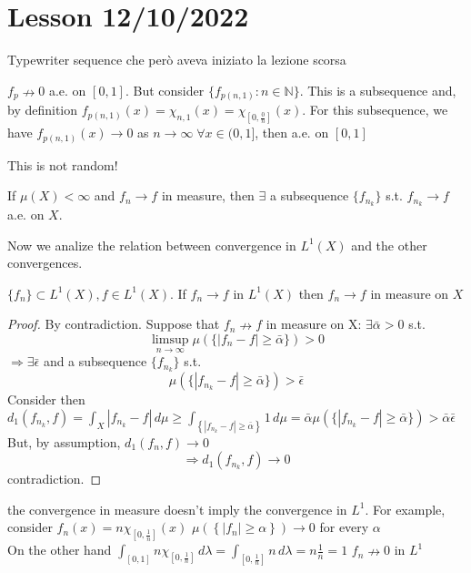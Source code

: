 \section{Lesson 12/10/2022}
Typewriter sequence che però aveva iniziato la lezione scorsa

\begin{remark}
    \( f_p \nrightarrow 0 \) a.e. on \(\left[ 0, 1\right]\).  
    But consider \( \{ f_{p(n,1)}: n \in \mathbb{N} \} \). 
    This is a subsequence and, by definition \( f_{p(n, 1)}(x) = \chi_{n, 1}(x)= \chi_{\left[0, \frac{0}{n} \right]}(x) \). 
    For this subsequence, we have \( f_{p(n,1)}(x) \rightarrow 0 \) as \( n \to\infty \; \forall x \in (0, 1] \), then a.e. on \(\left[0, 1\right]\)
\end{remark}
This is not random!

\begin{proposition}
    If \(\mu(X) < \infty \) and \(f_n \rightarrow f \) in measure, then \(\exists\) a subsequence \(\{f_{n_k} \}\) s.t. \(f_{n_k} \to f \) a.e. on \(X\).
\end{proposition}
Now we analize the relation between convergence in \(L^1(X)\) and the other convergences.

\begin{theorem}
    \( \{f_n\} \subset L^1(X), f \in L^1(X) \). If \(f_n \rightarrow f \) in \(L^1(X)\) then \(f_n \rightarrow f \) in measure on \(X\)
\end{theorem}
\begin{proof}
    By contradiction. Suppose that \(f_n \nrightarrow f \) in measure on X: 
    \( \exists \bar{\alpha} > 0 \) s.t. 
    \[ \limsup_{n\to\infty} \mu(\{ |f_n-f| \geq \bar{\alpha} \}) > 0 \]
    \(\Rightarrow \exists \bar{\epsilon}\) and a subsequence \( \{ f_{n_k} \} \) s.t.
    \[ \mu(\{ |f_{n_k}-f| \geq \bar{\alpha} \}) > \bar{\epsilon} \]
    Consider then \(d_1(f_{n_k}, f)= \int_X |f_{n_k} - f| \, d\mu  \geq \int_{\left\{|f_{n_k}-f|\geq \bar{\alpha}  \right\}} 1 \, d\mu 
    = \bar{\alpha} \mu (\{|f_{n_k } - f| \geq \bar{\alpha}\}) > \bar{\alpha} \bar{\epsilon}\) 
    But, by assumption, \(d_1(f_n, f) \rightarrow 0\)
    \[ \Rightarrow d_1(f_{n_k}, f) \rightarrow 0 \] 
    contradiction.
\end{proof}

\begin{remark}
    the convergence in measure doesn't imply the convergence in \(L^1\). For example, consider 
    \( f_n (x) = n \chi_{\left[0, \frac{1}{n} \right]}(x) \)
    \( \mu \left( \left\{ |f_n| \geq \alpha \right\}\right) \to 0 \) for every \(\alpha\) \\
    On the other hand \( \int _{\left[0, 1\right]} n \chi_{\left[0, \frac{1}{n} \right]} \, d\lambda = \int_{\left[0, \frac{1}{n}\right]} n \, d\lambda = n \frac{1}{n} = 1\)
    \( f_n \nrightarrow 0\) in \(L^1\) 
\end{remark}


